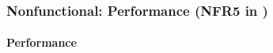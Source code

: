 \documentclass[12pt, titlepage]{article}
\begin{document}



\subsubsection{Nonfunctional: Performance (NFR5 in \citet{SRS})}
		
\paragraph{Performance}
\end{document}
